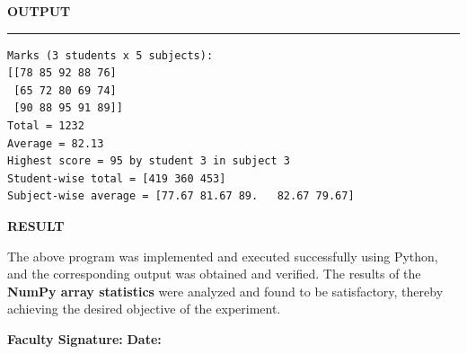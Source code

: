 \documentclass[11pt,twoside]{article}
\newcommand{\expheading}[1]{{\fontsize{14}{17}\selectfont\textbf{#1}\par}}
\newcommand{\tooddpage}{\clearpage\ifodd\value{page}\else\null\thispagestyle{empty}\newpage\fi}
\begin{document}
\tooddpage
\expheading{OUTPUT}
\vspace{2pt}
\noindent\rule{\textwidth}{0.5pt}\par
\vspace{4pt}
\begin{verbatim}
Marks (3 students x 5 subjects):
[[78 85 92 88 76]
 [65 72 80 69 74]
 [90 88 95 91 89]]
Total = 1232
Average = 82.13
Highest score = 95 by student 3 in subject 3
Student-wise total = [419 360 453]
Subject-wise average = [77.67 81.67 89.   82.67 79.67]
\end{verbatim}
\vspace{4pt}

\expheading{RESULT}
\vspace{4pt}
{\fontsize{12}{15}\selectfont
The above program was implemented and executed successfully using Python, and the corresponding output was obtained and verified. The results of the \textbf{NumPy array statistics} were analyzed and found to be satisfactory, thereby achieving the desired objective of the experiment.\par
}

\vspace{12pt}

\noindent\textbf{Faculty Signature:} \underline{\hspace{3.6cm}} \hfill \textbf{Date:} \underline{\hspace{2.8cm}}\par

\tooddpage
\end{document}
